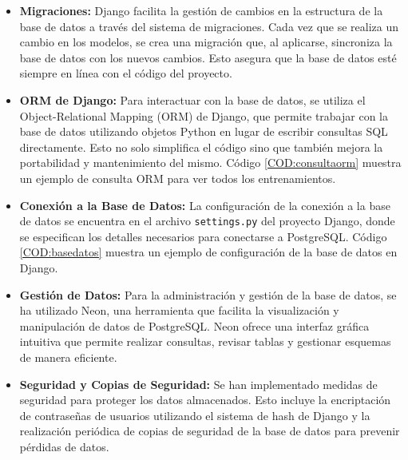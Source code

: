\begin{itemize}
    \item \textbf{Migraciones:} Django facilita la gestión de cambios en la estructura de la base de datos a través del sistema de migraciones. Cada vez que se realiza un cambio en los modelos, se crea una migración que, al aplicarse, sincroniza la base de datos con los nuevos cambios. Esto asegura que la base de datos esté siempre en línea con el código del proyecto.

    \item \textbf{ORM de Django:} Para interactuar con la base de datos, se utiliza el Object-Relational Mapping (ORM) de Django, que permite trabajar con la base de datos utilizando objetos Python en lugar de escribir consultas SQL directamente. Esto no solo simplifica el código sino que también mejora la portabilidad y mantenimiento del mismo. Código \ref{COD:consultaorm} muestra un ejemplo de consulta ORM para ver todos los entrenamientos.

    \item \textbf{Conexión a la Base de Datos:} La configuración de la conexión a la base de datos se encuentra en el archivo \texttt{settings.py} del proyecto Django, donde se especifican los detalles necesarios para conectarse a PostgreSQL. Código \ref{COD:basedatos} muestra un ejemplo de configuración de la base de datos en Django.

    \item \textbf{Gestión de Datos:} Para la administración y gestión de la base de datos, se ha utilizado Neon, una herramienta que facilita la visualización y manipulación de datos de PostgreSQL. Neon ofrece una interfaz gráfica intuitiva que permite realizar consultas, revisar tablas y gestionar esquemas de manera eficiente.
    \item \textbf{Seguridad y Copias de Seguridad:} Se han implementado medidas de seguridad para proteger los datos almacenados. Esto incluye la encriptación de contraseñas de usuarios utilizando el sistema de hash de Django y la realización periódica de copias de seguridad de la base de datos para prevenir pérdidas de datos.
\end{itemize}